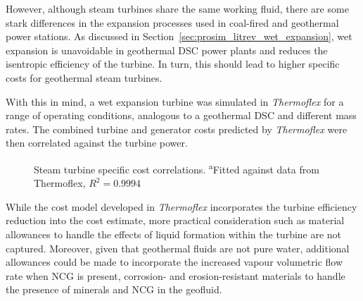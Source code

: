         \begin{table}[H]
            \caption[Steam turbine cost correlations.]{Steam turbine cost correlations.\(\Dot{W}\) is the fluid power in \unit{\kilo\watt}, \(\Dot{W}_s\) is the shaft power in \unit{\kilo\watt}, and \(\Dot{W}_e\) is the electrical power in \unit{\kilo\watt}. \textsuperscript{a}Fitted against data from Thermoflex, \(R^2=0.9994\)}
            \centering 
            \label{table:SteamTurbineCosts}
            \scalebox{0.75}{
                
            }
        \end{table}

        However, although steam turbines share the same working fluid, there are some stark differences in the expansion processes used in coal-fired and geothermal power stations. As discussed in Section~\ref{sec:prosim_litrev_wet_expansion}, wet expansion is unavoidable in geothermal \ac{DSC} power plants and reduces the isentropic efficiency of the turbine. In turn, this should lead to higher specific costs for geothermal steam turbines.

        With this in mind, a wet expansion turbine was simulated in \emph{Thermoflex} \cite{Thermoflex2021} for a range of operating conditions, analogous to a geothermal \ac{DSC} and different mass rates. The combined turbine and generator costs predicted by \emph{Thermoflex} were then correlated against the turbine power. 


        \begin{figure}[H]
            \centering
            
            \caption[Steam turbine specific cost correlations.]{Steam turbine specific cost correlations. \textsuperscript{a}Fitted against data from Thermoflex, \(R^2=0.9994\)}
            \label{fig:prosim_litrev_steamturb_speccost}
        \end{figure}

        While the cost model developed in \emph{Thermoflex} incorporates the turbine efficiency reduction into the cost estimate, more practical consideration such as material allowances to handle the effects of liquid formation within the turbine are not captured. Moreover, given that geothermal fluids are not pure water, additional allowances could be made to incorporate the increased vapour volumetric flow rate when \ac{NCG} is present, corrosion- and erosion-resistant materials to handle the presence of minerals and \ac{NCG} in the geofluid. 

